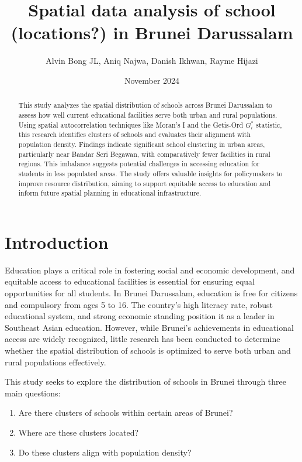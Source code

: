 \documentclass[12pt]{article}
\title{Spatial data analysis of school (locations?) in Brunei Darussalam }
\author{Alvin Bong JL, Aniq Najwa, Danish Ikhwan, Rayme Hijazi}
\date{November 2024}
\begin{document}
\maketitle
\begin{abstract}
\noindent
    This study analyzes the spatial distribution of schools across Brunei Darussalam to assess how well current educational facilities serve both urban and rural populations. Using spatial autocorrelation techniques like Moran’s I and the Getis-Ord \( G_i^* \) statistic, this research identifies clusters of schools and evaluates their alignment with population density. Findings indicate significant school clustering in urban areas, particularly near Bandar Seri Begawan, with comparatively fewer facilities in rural regions. This imbalance suggests potential challenges in accessing education for students in less populated areas. The study offers valuable insights for policymakers to improve resource distribution, aiming to support equitable access to education and inform future spatial planning in educational infrastructure. 
\end{abstract}


\section{Introduction}
\label{sec: intro}
Education plays a critical role in fostering social and economic development, and equitable access to educational facilities is essential for ensuring equal opportunities for all students. In Brunei Darussalam, education is free for citizens and compulsory from ages 5 to 16. The country’s high literacy rate, robust educational system, and strong economic standing position it as a leader in Southeast Asian education. However, while Brunei’s achievements in educational access are widely recognized, little research has been conducted to determine whether the spatial distribution of schools is optimized to serve both urban and rural populations effectively. 

This study seeks to explore the distribution of schools in Brunei through three main questions:
\begin{enumerate}
    \item Are there clusters of schools within certain areas of Brunei?
    \item Where are these clusters located?
    \item Do these clusters align with population density?
\end{enumerate}
\end{document}
